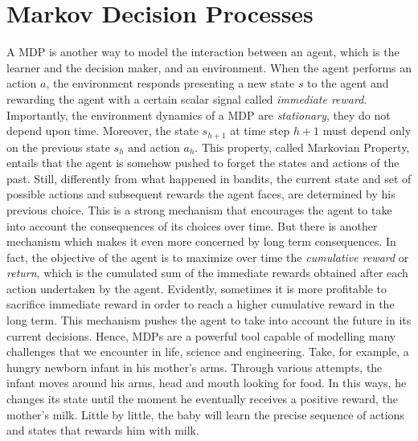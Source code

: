 \section{Markov Decision Processes}
A \gls{MDP} is another way to model the interaction between an agent, which is the learner and the decision maker, and an environment. When the agent performs an action $a$, the environment responds presenting a new state $s$ to the agent and rewarding the agent with a certain scalar signal called \emph{immediate reward}. Importantly, the environment dynamics of a \gls{MDP} are \emph{stationary}, \ie they do not depend upon time. Moreover, the state $s_{h+1}$ at time step $h+1$ must depend only on the previous state $s_{h}$ and action   $a_{h}$. This property, called Markovian Property, entails that the agent is somehow pushed to forget the states and actions of the past. Still, differently from what happened in bandits, the current state and set of possible actions and subsequent rewards the agent faces, are determined by his previous choice. This is a strong mechanism that encourages the agent to take into account the consequences of its choices over time. But there is another mechanism which makes it even more concerned by long term consequences. In fact, the objective of the agent is to maximize over time the  \emph{cumulative reward} or \emph{return}, which is the cumulated sum of the immediate rewards obtained after each action undertaken by the agent. Evidently, sometimes it is more profitable to sacrifice immediate reward in order to reach a higher cumulative reward in the long term. This mechanism pushes the agent to take into account the future in its current decisions. 
Hence, \gls{MDP}s are a powerful tool capable of modelling many challenges that we encounter in life, science and engineering. Take, for example, a hungry newborn infant in his mother's arms. Through various attempts, the infant moves around his arms, head and mouth looking for food. In this ways, he changes its state until the moment he eventually receives a positive reward, the mother's milk. Little by little, the baby will learn the precise sequence of actions and states that rewards him with milk.

